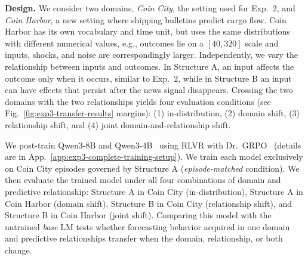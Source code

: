 \documentclass{article}
\begin{document}
\noindent\textbf{Design.}
We consider two domains, \emph{Coin City}, the setting used for Exp.~2, and \emph{Coin Harbor}, a new setting where shipping bulletins predict cargo flow.
Coin Harbor has its own vocabulary and time unit, but uses the same distributions with different numerical values, e.g., outcomes lie on a $[40,320]$ scale and inputs, shocks, and noise are correspondingly larger.
Independently, we vary the relationship between inputs and outcomes.
In Structure A, an input affects the outcome only when it occurs, similar to Exp.~2, while in Structure B an input can have effects that persist after the news signal disappears. Crossing the two domains with the two relationships yields four evaluation conditions (see Fig.~\ref{fig:exp3-transfer-results} margins): (1) in-distribution, (2) domain shift, (3) relationship shift, and (4) joint domain-and-relationship shift.

We post-train Qwen3-8B and Qwen3-4B~\citep{yang2025qwen3} using RLVR with Dr.~GRPO~\citep{liu2024oat} (details are in App.~\ref{app:exp3-complete-training-setup}).
We train each model exclusively on Coin City episodes governed by Structure A (\textit{episode-matched} condition). We then evaluate the trained model under all four combinations of domain and predictive relationship: Structure A in Coin City (in-distribution), Structure A in Coin Harbor (domain shift), Structure B in Coin City (relationship shift), and Structure B in Coin Harbor (joint shift). Comparing this model with the untrained \textit{base} LM tests whether forecasting behavior acquired in one domain and predictive relationships transfer when the domain, relationship, or both change.
\end{document}
